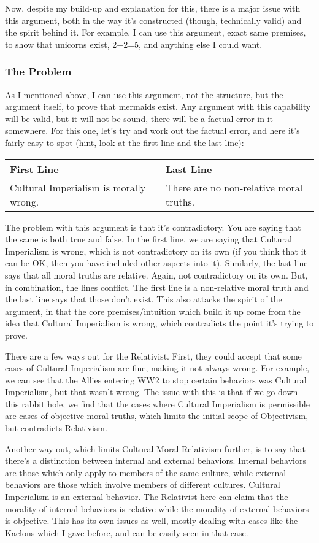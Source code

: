 Now, despite my build-up and explanation for this, there is a major issue with this argument, both in the way it's constructed (though, technically valid) and the spirit behind it. For example, I can use this argument, exact same premises, to show that unicorns exist, 2+2=5, and anything else I could want. 

\subsubsection{The Problem}

As I mentioned above, I can use this argument, not the structure, but the argument itself, to prove that mermaids exist. Any argument with this capability will be valid, but it will not be sound, there will be a factual error in it somewhere. For this one, let's try and work out the factual error, and here it's fairly easy to spot (hint, look at the first line and the last line):
\noindent
\begin{tabular}{p{2.75in}|p{2.75in}}
First Line&Last Line\\\hline
Cultural Imperialism is morally wrong.&There are no non-relative moral truths.
\end{tabular}
The problem with this argument is that it's contradictory. You are saying that the same is both true and false. In the first line, we are saying that Cultural Imperialism is wrong, which is not contradictory on its own (if you think that it can be OK, then you have included other aspects into it). Similarly, the last line says that all moral truths are relative. Again, not contradictory on its own. But, in combination, the lines conflict. The first line is a non-relative moral truth and the last line says that those don't exist. This also attacks the spirit of the argument, in that the core premises/intuition which build it up come from the idea that Cultural Imperialism is wrong, which contradicts the point it's trying to prove. 

There are a few ways out for the Relativist. First, they could accept that some cases of Cultural Imperialism are fine, making it not always wrong. For example, we can see that the Allies entering WW2 to stop certain behaviors was Cultural Imperialism, but that wasn't wrong. The issue with this is that if we go down this rabbit hole, we find that the cases where Cultural Imperialism is permissible are cases of objective moral truths, which limits the initial scope of Objectivism, but contradicts Relativism. 

Another way out, which limits Cultural Moral Relativism further, is to say that there's a distinction between internal and external behaviors. Internal behaviors are those which only apply to members of the same culture, while external behaviors are those which involve members of different cultures. Cultural Imperialism is an external behavior. The Relativist here can claim that the morality of internal behaviors is relative while the morality of external behaviors is objective. This has its own issues as well, mostly dealing with cases like the Kaelons which I gave before, and can be easily seen in that case. 

